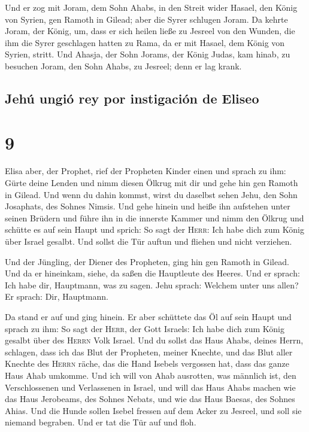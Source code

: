  Und er zog mit Joram, dem Sohn Ahabs, in den Streit
wider Hasael, den König von Syrien, gen Ramoth in Gilead; aber die Syrer
schlugen Joram.  Da kehrte Joram, der König, um, dass er
sich heilen ließe zu Jesreel von den Wunden, die ihm die Syrer
geschlagen hatten zu Rama, da er mit Hasael, dem König von Syrien,
stritt. Und Ahasja, der Sohn Jorams, der König Judas, kam hinab, zu
besuchen Joram, den Sohn Ahabs, zu Jesreel; denn er lag krank.

\hypertarget{jehuxfa-ungiuxf3-rey-por-instigaciuxf3n-de-eliseo}{%
\subsection{Jehú ungió rey por instigación de
Eliseo}\label{jehuxfa-ungiuxf3-rey-por-instigaciuxf3n-de-eliseo}}

\hypertarget{section-8}{%
\section{9}\label{section-8}}

 Elisa aber, der Prophet, rief der Propheten Kinder einen
und sprach zu ihm: Gürte deine Lenden und nimm diesen Ölkrug mit dir und
gehe hin gen Ramoth in Gilead.  Und wenn du dahin kommst,
wirst du daselbst sehen Jehu, den Sohn Josaphats, des Sohnes Nimsis. Und
gehe hinein und heiße ihn aufstehen unter seinen Brüdern und führe ihn
in die innerste Kammer  und nimm den Ölkrug und schütte es
auf sein Haupt und sprich: So sagt der \textsc{Herr}: Ich habe dich zum
König über Israel gesalbt. Und sollst die Tür auftun und fliehen und
nicht verziehen.

 Und der Jüngling, der Diener des Propheten, ging hin gen
Ramoth in Gilead.  Und da er hineinkam, siehe, da saßen
die Hauptleute des Heeres. Und er sprach: Ich habe dir, Hauptmann, was
zu sagen. Jehu sprach: Welchem unter uns allen? Er sprach: Dir,
Hauptmann.

 Da stand er auf und ging hinein. Er aber schüttete das Öl
auf sein Haupt und sprach zu ihm: So sagt der \textsc{Herr}, der Gott
Israels: Ich habe dich zum König gesalbt über des \textsc{Herrn} Volk
Israel.  Und du sollst das Haus Ahabs, deines Herrn,
schlagen, dass ich das Blut der Propheten, meiner Knechte, und das Blut
aller Knechte des \textsc{Herrn} räche, das die Hand Isebels vergossen
hat,  dass das ganze Haus Ahab umkomme. Und ich will von
Ahab ausrotten, was männlich ist, den Verschlossenen und Verlassenen in
Israel,  und will das Haus Ahabs machen wie das Haus
Jerobeams, des Sohnes Nebats, und wie das Haus Baesas, des Sohnes Ahias.
 Und die Hunde sollen Isebel fressen auf dem Acker zu
Jesreel, und soll sie niemand begraben. Und er tat die Tür auf und floh.

